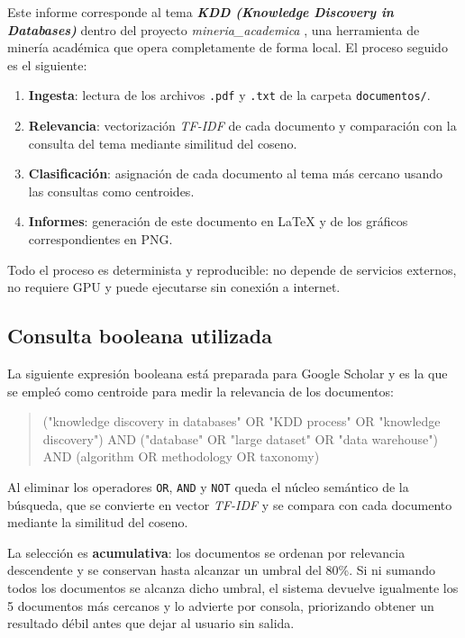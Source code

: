 \documentclass[11pt,a4paper]{article}
\newcommand{\tema}[1]{\textbf{\textit{#1}}}
\newcommand{\pcento}{\%}
\begin{document}
Este informe corresponde al tema \tema{ KDD (Knowledge Discovery in Databases) } dentro del
proyecto \textit{ mineria\_academica }, una herramienta de minería académica que
opera completamente de forma local. El proceso seguido es el siguiente:

\begin{enumerate}
  \item \textbf{Ingesta}: lectura de los archivos \texttt{.pdf} y
        \texttt{.txt} de la carpeta \texttt{documentos/}.
  \item \textbf{Relevancia}: vectorización \textit{TF-IDF} de cada documento
        y comparación con la consulta del tema mediante similitud del coseno.
  \item \textbf{Clasificación}: asignación de cada documento al tema más
        cercano usando las consultas como centroides.
  \item \textbf{Informes}: generación de este documento en \LaTeX{} y de los
        gráficos correspondientes en PNG.
\end{enumerate}

Todo el proceso es determinista y reproducible: no depende de servicios
externos, no requiere GPU y puede ejecutarse sin conexión a internet.

\subsection{Consulta booleana utilizada}
\label{sec:query}

La siguiente expresión booleana está preparada para Google Scholar y es la que
se empleó como centroide para medir la relevancia de los documentos:

\begin{quote}
\small\ttfamily
("knowledge discovery in databases" OR "KDD process" OR "knowledge discovery") AND ("database" OR "large dataset" OR "data warehouse") AND (algorithm OR methodology OR taxonomy)
\end{quote}

Al eliminar los operadores \texttt{OR}, \texttt{AND} y \texttt{NOT} queda el
núcleo semántico de la búsqueda, que se convierte en vector \textit{TF-IDF} y
se compara con cada documento mediante la similitud del coseno.

La selección es \textbf{acumulativa}: los documentos se ordenan por relevancia
descendente y se conservan hasta alcanzar un umbral del
80\pcento. Si ni sumando todos los documentos se alcanza
dicho umbral, el sistema devuelve igualmente los 5
documentos más cercanos y lo advierte por consola, priorizando obtener un
resultado débil antes que dejar al usuario sin salida.
\end{document}
